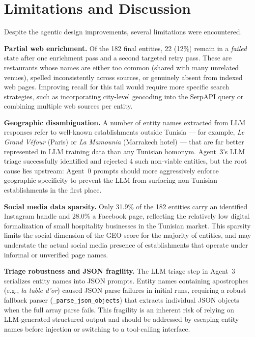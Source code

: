 \section{Limitations and Discussion}

Despite the agentic design improvements, several limitations were encountered.

\textbf{Partial web enrichment.} Of the 182 final entities, 22 (12\%) remain in a
\textit{failed} state after one enrichment pass and a second targeted retry pass.
These are restaurants whose names are either too common (shared with many
unrelated venues), spelled inconsistently across sources, or genuinely absent from
indexed web pages. Improving recall for this tail would require more specific
search strategies, such as incorporating city-level geocoding into the SerpAPI
query or combining multiple web sources per entity.

\textbf{Geographic disambiguation.} A number of entity names extracted from LLM
responses refer to well-known establishments outside Tunisia --- for example,
\textit{Le Grand Véfour} (Paris) or \textit{La Mamounia} (Marrakech hotel) ---
that are far better represented in LLM training data than any Tunisian homonym.
Agent~3's LLM triage successfully identified and rejected 4 such non-viable
entities, but the root cause lies upstream: Agent~0 prompts should more
aggressively enforce geographic specificity to prevent the LLM from surfacing
non-Tunisian establishments in the first place.

\textbf{Social media data sparsity.} Only 31.9\% of the 182 entities carry an
identified Instagram handle and 28.0\% a Facebook page, reflecting the relatively
low digital formalization of small hospitality businesses in the Tunisian market.
This sparsity limits the social dimension of the GEO score for the majority of
entities, and may understate the actual social media presence of establishments
that operate under informal or unverified page names.

\textbf{Triage robustness and JSON fragility.} The LLM triage step in Agent~3
serializes entity names into JSON prompts. Entity names containing apostrophes
(e.g., \textit{la table d'or}) caused JSON parse failures in initial runs,
requiring a robust fallback parser (\texttt{\_parse\_json\_objects}) that extracts
individual JSON objects when the full array parse fails. This fragility is an
inherent risk of relying on LLM-generated structured output and should be
addressed by escaping entity names before injection or switching to a
tool-calling interface.


